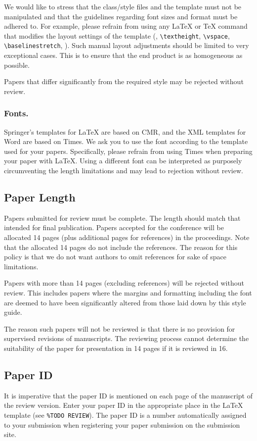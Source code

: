 \documentclass[runningheads]{llncs}
\begin{document}
We would like to stress that the class/style files and the template must not be manipulated and that the guidelines regarding font sizes and format must be adhered to. 
For example, please refrain from using any \LaTeX{} or \TeX{} command that modifies the layout settings of the template (\eg, \verb+\textheight+, \verb+\vspace+, \verb+\baselinestretch+, \etc).
Such manual layout adjustments should be limited to very exceptional cases.
This is to ensure that the end product is as homogeneous as possible.

Papers that differ significantly from the required style may be rejected without review.


\subsubsection{Fonts.}
Springer's templates for \LaTeX{} are based on CMR, and the XML templates for Word are based on Times. 
We ask you to use the font according to the template used for your papers. 
Specifically, please refrain from using Times when preparing your paper with \LaTeX{}.
Using a different font can be interpreted as purposely circumventing the length limitations and may lead to rejection without review.


\subsection{Paper Length}
Papers submitted for review must be complete. 
The length should match that intended for final publication. 
Papers accepted for the conference will be allocated 14 pages (plus additional pages for references) in the proceedings. 
Note that the allocated 14 pages do not include the references. 
The reason for this policy is that we do not want authors to omit references for sake of space limitations.

Papers with more than 14 pages (excluding references) will be rejected without review.
This includes papers where the margins and formatting including the font are deemed to have been significantly altered from those laid down by this style guide.

The reason such papers will not be reviewed is that there is no provision for supervised revisions of manuscripts. 
The reviewing process cannot determine the suitability of the paper for presentation in 14 pages if it is reviewed in 16.


\subsection{Paper ID}
It is imperative that the paper ID is mentioned on each page of the manuscript of the review version.
Enter your paper ID in the appropriate place in the \LaTeX{} template (see \texttt{\%TODO REVIEW}).
The paper ID is a number automatically assigned to your submission when registering your paper submission on the submission site.
\end{document}
